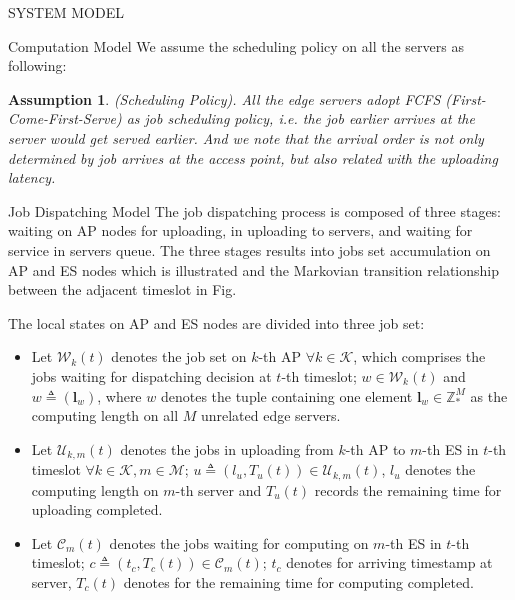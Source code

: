 \documentclass[10pt, conference, letterpaper]{IEEEtran}
\newtheorem{assumption}{Assumption}
\newcommand{\domZ}{\mathbb{Z}_{*}}
\renewcommand{\vec}{\mathbf}
\newcommand{\apSet}{\mathcal{K}}
\newcommand{\esSet}{\mathcal{M}}
\newcommand{\wSet}{\mathcal{W}}
\newcommand{\uSet}{\mathcal{U}}
\newcommand{\cSet}{\mathcal{C}}
\begin{document}
\begin{section}{SYSTEM MODEL}
\begin{subsection}{Computation Model}
            We assume the scheduling policy on all the servers as following:
            \begin{assumption}
                (Scheduling Policy).
                All the edge servers adopt \emph{FCFS} (First-Come-First-Serve) as job scheduling policy, i.e. the job earlier arrives at the server would get served earlier. And we note that the arrival order is not only determined by job arrives at the access point, but also related with the uploading latency.
            \end{assumption}
        \end{subsection}

        \begin{subsection}{Job Dispatching Model}
            The job dispatching process is composed of three stages: waiting on AP nodes for uploading, in uploading to servers, and waiting for service in servers queue. The three stages results into jobs set accumulation on AP and ES nodes which is illustrated and the Markovian transition relationship between the adjacent timeslot in Fig.

            The local states on AP and ES nodes are divided into three job set:
            \begin{itemize}
                \item Let $\wSet_{k}(t)$ denotes the job set on $k$-th AP $\forall k \in \apSet$, which comprises the jobs waiting for dispatching decision at $t$-th timeslot; $w \in \wSet_{k}(t)$ and $w \triangleq (\vec{l}_w)$, where $w$ denotes the tuple containing one element $\vec{l}_w \in \domZ^M$ as the computing length on all $M$ unrelated edge servers.
                \item Let $\uSet_{k,m}(t)$ denotes the jobs in uploading from $k$-th AP to $m$-th ES in $t$-th timeslot $\forall k \in \apSet, m \in \esSet$; $u \triangleq (l_u, T_{u}(t)) \in \uSet_{k,m}(t)$, $l_u$ denotes the computing length on $m$-th server and $T_{u}(t)$ records the remaining time for uploading completed.
                \item Let $\cSet_{m}(t)$ denotes the jobs waiting for computing on $m$-th ES in $t$-th timeslot; $c \triangleq (t_c, T_{c}(t)) \in \cSet_{m}(t)$; $t_c$ denotes for arriving timestamp at server, $T_{c}(t)$ denotes for the remaining time for computing completed.
            \end{itemize}


\end{subsection}
\end{section}
\end{document}
